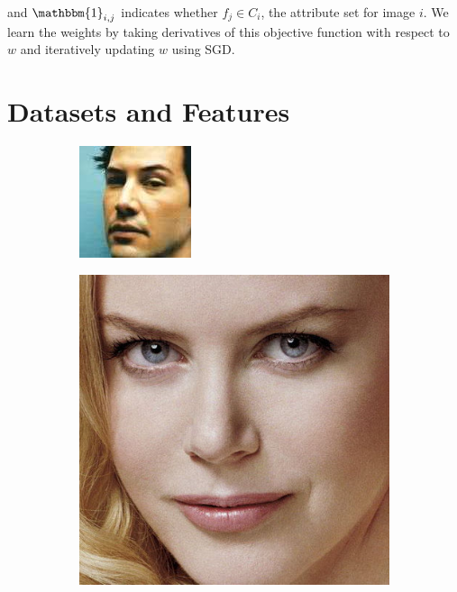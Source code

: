 \documentclass[10pt,twocolumn,letterpaper]{article}
\begin{document}
and $\mathbbm{1}_{i,j}$ indicates whether $f_j\in C_i$, the attribute set for image $i$.
We learn the weights by taking derivatives of this objective function with respect to $w$ and iteratively updating $w$ using SGD.
\section{Datasets and Features}
\begin{figure}[h]
    \centering
    \begin{subfigure}[b]{0.24\linewidth}
        \includegraphics[width=\linewidth]{images/dataset/Keanu_Reeves_308}
        \label{fig:keanu}
    \end{subfigure}
    \hfill
    \begin{subfigure}[b]{0.24\linewidth}
        \includegraphics[width=\linewidth]{images/dataset/Nicole_Kidman_386}

\end{subfigure}
\end{figure}
\end{document}
